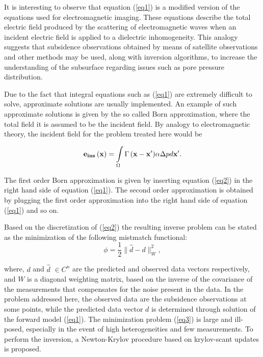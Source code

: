 \documentclass{report}
\begin{document}
It is interesting to observe that equation (\ref{eq1}) is a
modified version of the equations used for electromagnetic
imaging. These equations describe the total electric field
produced by the scattering of electromagnetic waves when an
incident electric field is applied to a dielectric inhomogeneity.
This analogy suggests that subsidence observations obtained by
means of satellite observations and other methods may be used,
along with inversion algorithms, to increase the understanding of
the subsurface regarding issues such as pore pressure
distribution.

Due to the fact that integral equations such as (\ref{eq1}) are
extremely difficult to solve, approximate solutions are usually
implemented. An example of such approximate solutions is given by
the so called Born approximation, where the total field it is
assumed to be the incident field. By analogy to electromagnetic
theory, the incident field for the problem treated here would be

\begin{equation}
{\bf{e_{ins}}}\left( {\bf{x}} \right) = \int\limits_\Omega
{\Gamma \left( {{\bf{x - x'}}} \right)} {\bf{\alpha }}\Delta
pd{\bf{x'}}. \label{eq2}
\end{equation}

The first order Born approximation is given by inserting equation
(\ref{eq2}) in the right hand side of equation (\ref{eq1}). The
second order approximation is obtained by plugging the first order
approximation into the right hand side of equation (\ref{eq1}) and
so on.

Based on the discretization of (\ref{eq2}) the resulting inverse
problem can be stated as the minimization of the following
mistmatch functional:
\begin{equation}
\phi =\frac{1}{2} \|\hat{d}-d\|_W^2, \label{eq3}
\end{equation}

where, $d$ and $\hat{d}$ $\in C^n$ are the predicted and observed
data vectors respectively, and $W$ is a diagonal weighting matrix,
based on the inverse of the covariance of the measurements that
compensates for the noise present in the data. In the problem
addressed here, the observed data are the subsidence observations
at some points, while the predicted data vector $d$ is determined
through solution of the forward model (\ref{eq1}). The
minimization problem (\ref{eq3}) is large and ill-posed,
especially in the event of high heterogeneities and few
measurements. To perform the inversion, a Newton-Krylov procedure
based on krylov-scant updates is proposed.
\end{document}
